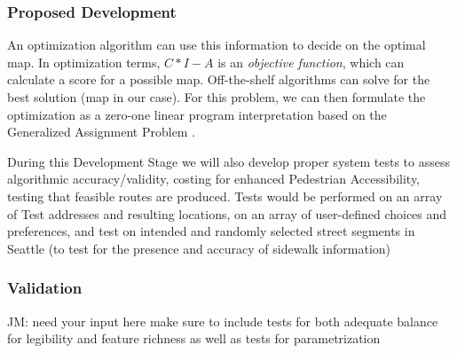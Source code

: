 

\subsubsection{Proposed Development}

An optimization algorithm can use this information to decide on the optimal map. In optimization terms, $C*I-A$ is an \textit{objective function}, which can calculate a score for a possible map. Off-the-shelf algorithms can solve for the best solution (map in our case). For this problem, we can then  formulate the optimization as a zero-one linear program interpretation based on the Generalized Assignment Problem
\cite{kuhn1955hungarian}. 

During this Development Stage we will also develop proper system tests to assess algorithmic accuracy/validity, costing for  enhanced Pedestrian Accessibility, testing that feasible routes are produced. Tests would be performed on  an array of Test addresses and resulting locations, on an array of user-defined choices and preferences, and test on 
intended and randomly selected street segments in Seattle (to test for the presence and accuracy of sidewalk information)



\subsubsection{Validation}
\ac{JM: need your input here}
\ac{ make sure to include tests for both adequate balance for legibility and feature richness as well as tests for parametrization }

